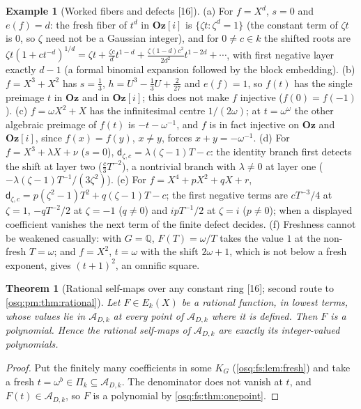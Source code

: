 \documentclass[11pt,letterpaper]{article}
\numberwithin{equation}{section}
\newtheorem{theorem}{Theorem}[section]
\theoremstyle{definition}
\newtheorem{example}[example]{Example}
\theoremstyle{remark}
\theoremstyle{plain}
\newcommand{\Oz}{\mathbf{Oz}}
\newcommand{\GOz}{\Oz[i]}
\newcommand{\Q}{\mathbb Q}
\newcommand{\A}{\mathcal A}          %
\newcommand{\src}[1]{\textup{\textsf{[#1]}}}
\begin{document}
\begin{example}[Worked fibers and defects \src{16}]\label{osq:fs:ex:worked}
(a) For $f=X^d$, $s=0$ and $e(f)=d$: the fresh fiber of $t^d$ in $\GOz$ is $\{\zeta t:\zeta^d=1\}$ (the constant term of $\zeta t$ is $0$, so
$\zeta$ need not be a Gaussian integer), and for $0\ne c\in k$ the shifted roots are
$\zeta t(1+ct^{-d})^{1/d}=\zeta t+\frac{\zeta c}{d}t^{1-d}+\frac{\zeta(1-d)c^2}{2d^2}t^{1-2d}+\cdots$, with first negative layer exactly
$d-1$ (a formal binomial expansion followed by the block embedding). (b) $f=X^3+X^2$ has $s=\tfrac13$, $h=U^3-\tfrac13U+\tfrac2{27}$ and
$e(f)=1$, so $f(t)$ has the single preimage $t$ in $\Oz$ and in $\GOz$; this does not make $f$ injective ($f(0)=f(-1)$). (c) $f=\omega X^2+X$
has the infinitesimal centre $1/(2\omega)$; at $t=\omega^\omega$ the other algebraic preimage of $f(t)$ is $-t-\omega^{-1}$, and $f$ is in fact
injective on $\Oz$ and $\GOz$, since $f(x)=f(y)$, $x\ne y$, forces $x+y=-\omega^{-1}$. (d) For $f=X^3+\lambda X+\nu$ ($s=0$),
$\mathsf d_{\zeta,c}=\lambda(\zeta-1)T-c$: the identity branch first detects the shift at layer two ($\frac c3T^{-2}$), a nontrivial branch
with $\lambda\ne0$ at layer one ($-\lambda(\zeta-1)T^{-1}/(3\zeta^2)$). (e) For $f=X^4+pX^2+qX+r$,
$\mathsf d_{\zeta,c}=p(\zeta^2-1)T^2+q(\zeta-1)T-c$; the first negative terms are $cT^{-3}/4$ at $\zeta=1$, $-qT^{-2}/2$ at $\zeta=-1$ ($q\ne0$) and
$ipT^{-1}/2$ at $\zeta=i$ ($p\ne0$); when a displayed coefficient vanishes the next term of the finite defect decides. (f) Freshness cannot be
weakened casually: with $G=\Q$, $F(T)=\omega/T$ takes the value $1$ at the non-fresh $T=\omega$; and $f=X^2$, $t=\omega$ with the shift
$2\omega+1$, which is not below a fresh exponent, gives $(t+1)^2$, an omnific square.
\end{example}

\begin{theorem}[Rational self-maps over any constant ring \src{16}; second route to \cref{osq:pm:thm:rational}]\label{osq:fs:thm:collapse}
Let $F\in E_k(X)$ be a rational function, in lowest terms, whose values lie in $\A_{D,k}$ at every point of $\A_{D,k}$ where it is defined.
Then $F$ is a polynomial. Hence the rational self-maps of $\A_{D,k}$ are exactly its integer-valued polynomials.
\end{theorem}
\begin{proof}
Put the finitely many coefficients in some $K_G$ (\cref{osq:fs:lem:fresh}) and take a fresh $t=\omega^b\in\Pi_k\subseteq\A_{D,k}$. The
denominator does not vanish at $t$, and $F(t)\in\A_{D,k}$, so $F$ is a polynomial by \cref{osq:fs:thm:onepoint}.
\end{proof}
\end{document}
